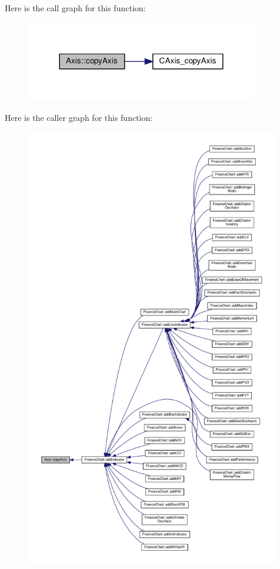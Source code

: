 Here is the call graph for this function\+:
\nopagebreak
\begin{figure}[H]
\begin{center}
\leavevmode
\includegraphics[width=288pt]{class_axis_a66990afb53a3c4b709178d1cb019092c_cgraph}
\end{center}
\end{figure}
Here is the caller graph for this function\+:
\nopagebreak
\begin{figure}[H]
\begin{center}
\leavevmode
\includegraphics[height=550pt]{class_axis_a66990afb53a3c4b709178d1cb019092c_icgraph}
\end{center}
\end{figure}
\mbox{\label{class_axis_a7e8e4de986cb83b59d23f0d9ed66deaf}} 
